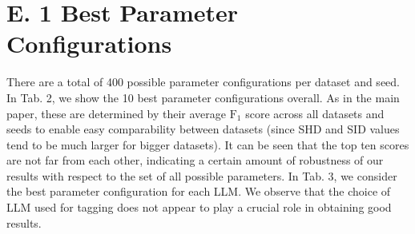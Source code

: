 \documentclass[10pt]{article}
\begin{document}
\section*{E. 1 Best Parameter Configurations}
There are a total of 400 possible parameter configurations per dataset and seed. In Tab. 2, we show the 10 best parameter configurations overall. As in the main paper, these are determined by their average $\mathrm{F}_{1}$ score across all datasets and seeds to enable easy comparability between datasets (since SHD and SID values tend to be much larger for bigger datasets). It can be seen that the top ten scores are not far from each other, indicating a certain amount of robustness of our results with respect to the set of all possible parameters. In Tab. 3, we consider the best parameter configuration for each LLM. We observe that the choice of LLM used for tagging does not appear to play a crucial role in obtaining good results.
\end{document}
